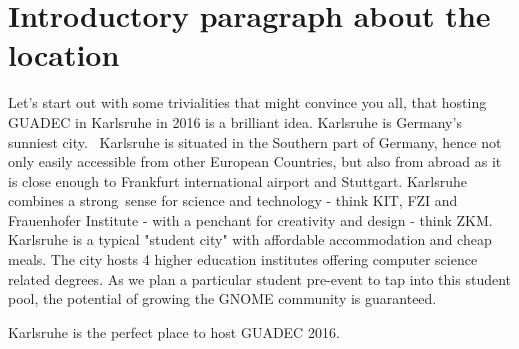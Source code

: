 \section{Introductory paragraph about the location}

Let's start out with some trivialities that might convince you all, that hosting GUADEC in Karlsruhe in 2016 is a brilliant idea. Karlsruhe is Germany's sunniest city.  Karlsruhe is situated in the Southern part of Germany, hence not only easily accessible from other European Countries, but also from abroad as it is close enough to Frankfurt international airport and Stuttgart. Karlsruhe combines a strong sense for science and technology - think KIT, FZI and Frauenhofer Institute - with a penchant for creativity and design - think ZKM. Karlsruhe is a typical "student city" with affordable accommodation and cheap meals. The city hosts 4 higher education institutes offering computer science related degrees. As we plan a particular student pre-event to tap into this student pool, the potential of growing the GNOME community is guaranteed.  

Karlsruhe is the perfect place to host GUADEC 2016. 
